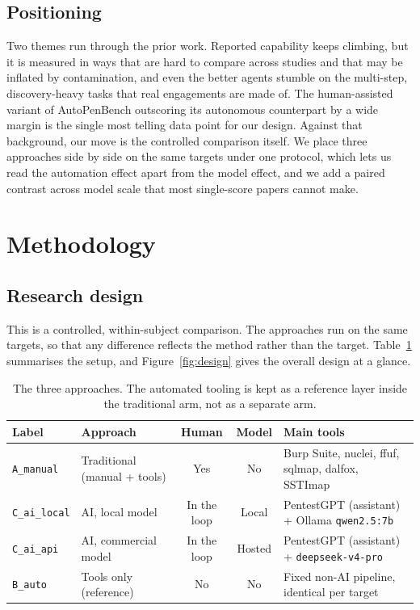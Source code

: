 \documentclass[11pt]{article}
\begin{document}
\subsection{Positioning}
Two themes run through the prior work. Reported capability keeps climbing, but it is measured in ways that are hard to compare across studies and that may be inflated by contamination, and even the better agents stumble on the multi-step, discovery-heavy tasks that real engagements are made of. The human-assisted variant of AutoPenBench outscoring its autonomous counterpart by a wide margin is the single most telling data point for our design. Against that background, our move is the controlled comparison itself. We place three approaches side by side on the same targets under one protocol, which lets us read the automation effect apart from the model effect, and we add a paired contrast across model scale that most single-score papers cannot make.

\section{Methodology}
\label{sec:method}

\subsection{Research design}
This is a controlled, within-subject comparison. The approaches run on the same targets, so that any difference reflects the method rather than the target. Table~\ref{tab:arms} summarises the setup, and Figure~\ref{fig:design} gives the overall design at a glance.

\begin{table}[htbp]
\centering
\caption{The three approaches. The automated tooling is kept as a reference layer inside the traditional arm, not as a separate arm.}
\label{tab:arms}
\small
\begin{tabular}{@{}llccl@{}}
\toprule
Label & Approach & Human & Model & Main tools \\
\midrule
\texttt{A\_manual} & Traditional (manual + tools) & Yes & No & Burp Suite, nuclei, ffuf, sqlmap, dalfox, SSTImap \\
\texttt{C\_ai\_local} & AI, local model & In the loop & Local & PentestGPT (assistant) + Ollama \texttt{qwen2.5:7b} \\
\texttt{C\_ai\_api} & AI, commercial model & In the loop & Hosted & PentestGPT (assistant) + \texttt{deepseek-v4-pro} \\
\midrule
\texttt{B\_auto} & Tools only (reference) & No & No & Fixed non-AI pipeline, identical per target \\
\bottomrule
\end{tabular}
\end{table}
\end{document}
